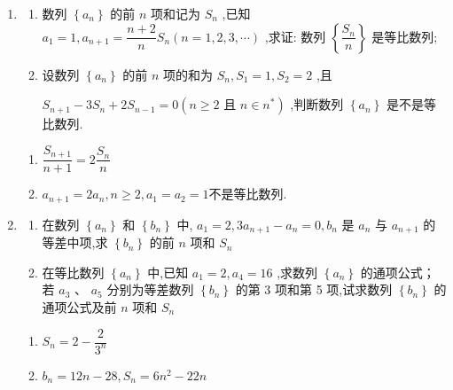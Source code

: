 \begin{enumerate}
    \item
    \begin{enumerate}
        \item 数列 $\left\{  {a}_{n}\right\}$ 的前 $n$ 项和记为 ${S}_{n}$ ,已知 ${a}_{1} = 1,{a}_{n + 1} = \dfrac{n + 2}{n}{S}_{n}\left( {n = 1,2,3,\cdots }\right)$ ,求证: 数列 $\left\{  \dfrac{{S}_{n}}{n}\right\}$ 是等比数列;
        \item 设数列 $\left\{  {a}_{n}\right\}$ 的前 $n$ 项的和为 ${S}_{n},{S}_{1} = 1,{S}_{2} = 2$ ,且

        ${S}_{n + 1} - 3{S}_{n} + 2{S}_{n - 1} = 0\left( {n \geq  2\text{ 且 }n \in  {n}^{ * }}\right)$ ,判断数列 $\left\{  {a}_{n}\right\}$ 是不是等比数列.
    \end{enumerate}
    \begin{jieda}
        \begin{enumerate}
            \item $\dfrac{S_{n+1}}{n+1} = 2 \dfrac{S_n}{n}$
            \item $a_{n+1} = 2a_n, n \geq 2, a_1 = a_2 = 1$不是等比数列.
        \end{enumerate}
    \end{jieda}

    \item 
    \begin{enumerate}
        \item 在数列 $\left\{  {a}_{n}\right\}$ 和 $\left\{  {b}_{n}\right\}$ 中, ${a}_{1} = 2,3{a}_{n + 1} - {a}_{n} = 0,{b}_{n}$ 是 ${a}_{n}$ 与 ${a}_{n + 1}$ 的等差中项,求 $\left\{  {b}_{n}\right\}$ 的前 $n$ 项和 ${S}_{n}$
        \item 在等比数列 $\left\{  {a}_{n}\right\}$ 中,已知 ${a}_{1} = 2,{a}_{4} = {16}$ ,求数列 $\left\{  {a}_{n}\right\}$ 的通项公式；若 ${a}_{3}\text{ 、 }{a}_{5}$ 分别为等差数列 $\left\{  {b}_{n}\right\}$ 的第 3 项和第 5 项,试求数列 $\left\{  {b}_{n}\right\}$ 的通项公式及前 $n$ 项和 ${S}_{n}$
    \end{enumerate}
    \begin{jieda}
        \begin{enumerate}
            \item $S_n = 2 - \dfrac{2}{3^n}$
            \item $b_n = 12n-28, S_n = 6n^2-22n$
        \end{enumerate}
    \end{jieda}
\end{enumerate}

